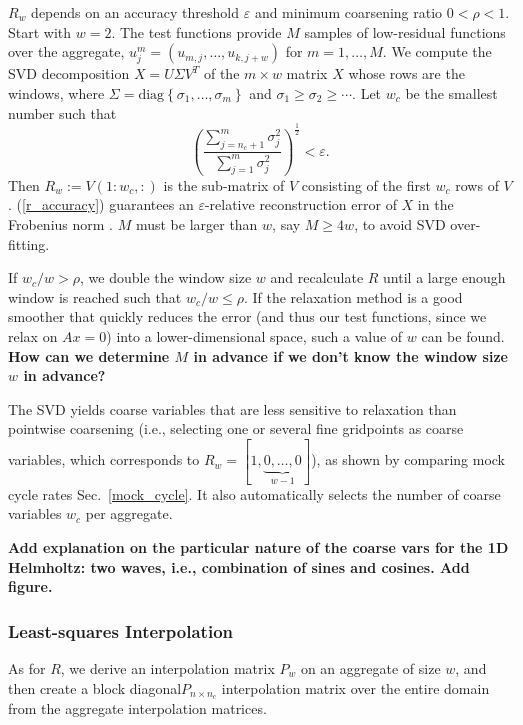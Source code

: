 \documentclass{article}
\begin{document}
$R_w$ depends on an accuracy threshold $\varepsilon$ and minimum coarsening ratio $0 < \rho < 1$. Start with $w = 2$. The test functions provide $M$ samples of low-residual functions over the aggregate, $u^m_j= (u_{m,j},\dots,u_{k,j+w})$ for $m = 1,\dots,M$. We compute the SVD decomposition $X = U \Sigma V^T$ of the $m \times w$ matrix $X$ whose rows are the windows, where $\Sigma = \text{diag}\left\{\sigma_1, \dots, \sigma_m \right\}$ and $\sigma_1 \geq \sigma_2 \geq \cdots$. Let $w_c$ be the smallest number such that
\begin{equation}
	\left(\frac{\sum_{j=n_c+1}^m \sigma_j^2}{\sum_{j=1}^m \sigma_j^2 } \right)^{\frac12} < \varepsilon.
	\label{r_accuracy}
\end{equation}
Then $R_w := V(1:w_c,:)$ is the sub-matrix of $V$ consisting of the first $w_c$ rows of $V$. (\ref{r_accuracy}) guarantees an $\varepsilon$-relative reconstruction error of $X$ in the Frobenius norm \cite{svd}. $M$ must be larger than $w$, say $M \geq 4 w$, to avoid SVD over-fitting.

If $w_c/w > \rho$, we double the window size $w$ and recalculate $R$ until a large enough window is reached such that $w_c/w \leq \rho$. If the relaxation method is a good smoother that quickly reduces the error (and thus our test functions, since we relax on $A x = 0$) into a lower-dimensional space, such a value of $w$ can be found.  {\bf How can we determine $M$ in advance if we don't know the window size $w$ in advance?}

The SVD yields coarse variables that are less sensitive to relaxation than pointwise coarsening (i.e., selecting one or several fine gridpoints as coarse variables, which corresponds to $R_w = [1,\underbrace{0,\dots,0}_{w-1}]$), as shown by comparing mock cycle rates Sec.~\ref{mock_cycle}. It also automatically selects the number of coarse variables $w_c$ per aggregate.

{\bf Add explanation on the particular nature of the coarse vars for the 1D Helmholtz: two waves, i.e., combination of sines and cosines. Add figure.}

\subsubsection{Least-squares Interpolation}
As for $R$, we derive an interpolation matrix $P_w$ on an aggregate of size $w$, and then create a block diagonal$P_{n \times n_c}$ interpolation matrix over the entire domain from the aggregate interpolation matrices.
\end{document}
